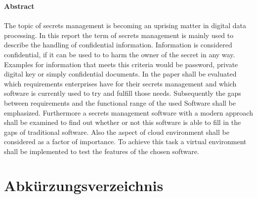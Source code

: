 \documentclass[
a4paper,   
titlepage,  
halfparskip,
12pt        
]{scrartcl}
\begin{document}
\large{\textbf{Abstract}}\\
\\
The topic of secrets management is becoming an uprising matter in digital data processing.
In this report the term of secrets management is mainly used to describe the handling of confidential information.
Information is considered confidential, if it can be used to to harm the owner of the secret in any way.  
Examples for information that meets this criteria would be password, private digital key or simply confidential documents.
In the paper shall be evaluated which requirements enterprises have for their secrets management and which software is currently used to try and fulfill those needs.
Subsequently the gaps between requirements and the functional range of the used Software shall be emphasized.
Furthermore a secrets management software with a modern approach shall be examined to find out whether or not this software is able to fill in the gaps of traditional software.
Also the aspect of cloud environment shall be considered as a factor of importance. 
To achieve this task a virtual environment shall be implemented to test the features of the chosen software.



\pagestyle{fancy}
\fancyhf{} %

\newpage
\tableofcontents
\newpage
\pagestyle{fancy}
\fancyhf{} %
\fancyhead[R]{\thepage} %
\section*{Abkürzungsverzeichnis} %
\begin{acronym}
\end{acronym}
\listoffigures
\listoftables
\newpage
\end{document}
